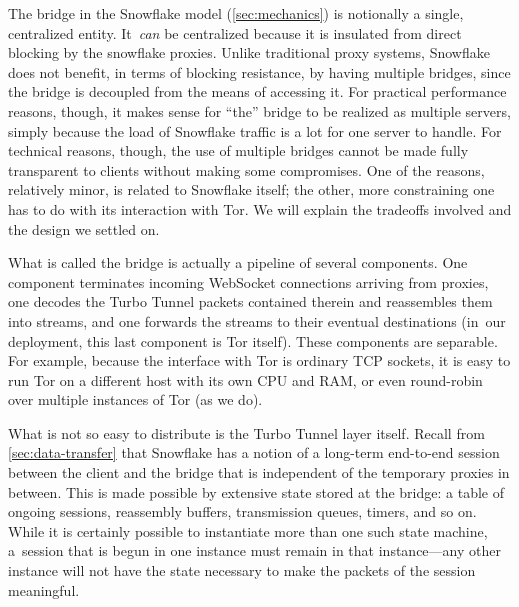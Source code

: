 \documentclass[letterpaper,twocolumn]{article}
\begin{document}

The bridge in the Snowflake model (\autoref{sec:mechanics})
is notionally a single, centralized entity.
It~\emph{can} be centralized
because it is insulated from direct blocking
by the snowflake proxies.
Unlike traditional proxy systems,
Snowflake does not benefit, in terms of blocking resistance,
by having multiple bridges,
since the bridge is decoupled from the means of accessing it.
For practical performance reasons, though,
it makes sense for ``the'' bridge to be realized as
multiple servers, simply because the load of Snowflake traffic
is a lot for one server to handle.
For technical reasons, though,
the use of multiple bridges cannot be made fully transparent to clients
without making some compromises.
One of the reasons, relatively minor, is related to Snowflake itself;
the other, more constraining one has to do with its interaction with Tor.
We will explain the tradeoffs involved
and the design we settled on.

What is called the bridge is actually a pipeline of several components.
One component terminates incoming WebSocket connections arriving from proxies,
one decodes the Turbo Tunnel packets contained therein and reassembles them into streams,
and one forwards the streams to their eventual destinations
(in~our deployment, this last component is Tor itself).
These components are separable.
For example, because the interface with Tor is ordinary TCP sockets,
it is easy to run Tor on a different host with its own CPU and RAM,
or even round-robin over multiple instances of Tor
(as we do).

What is not so easy to distribute
is the Turbo Tunnel layer itself.
Recall from \autoref{sec:data-transfer} that Snowflake
has a notion of a long-term end-to-end session
between the client and the bridge that is independent of
the temporary proxies in between.
This is made possible by extensive state stored at the bridge:
a table of ongoing sessions, reassembly buffers,
transmission queues, timers, and so on.
While it is certainly possible to instantiate more than one such state machine,
a~session that is begun in one instance must remain in that instance---any
other instance will not have the state necessary to make the packets
of the session meaningful.
\end{document}
